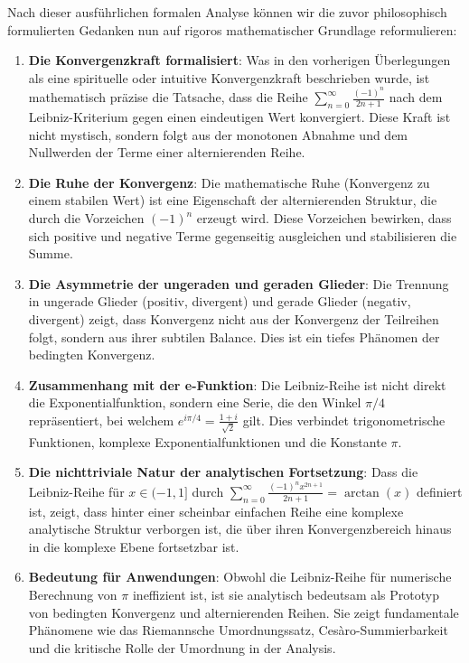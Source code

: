 \documentclass[a4paper, 12pt, twoside, openright]{report}
\theoremstyle{definition}
\theoremstyle{definition}
\begin{document}
Nach dieser ausführlichen formalen Analyse können wir die zuvor philosophisch formulierten Gedanken nun auf rigoros mathematischer Grundlage reformulieren:

\begin{enumerate}

\item \textbf{Die Konvergenzkraft formalisiert}: Was in den vorherigen Überlegungen als eine spirituelle oder intuitive Konvergenzkraft beschrieben wurde, ist mathematisch präzise die Tatsache, dass die Reihe $\sum_{n=0}^{\infty} \frac{(-1)^n}{2n+1}$ nach dem Leibniz-Kriterium gegen einen eindeutigen Wert konvergiert. Diese Kraft ist nicht mystisch, sondern folgt aus der monotonen Abnahme und dem Nullwerden der Terme einer alternierenden Reihe.

\item \textbf{Die Ruhe der Konvergenz}: Die mathematische Ruhe (Konvergenz zu einem stabilen Wert) ist eine Eigenschaft der alternierenden Struktur, die durch die Vorzeichen $(-1)^n$ erzeugt wird. Diese Vorzeichen bewirken, dass sich positive und negative Terme gegenseitig ausgleichen und stabilisieren die Summe.

\item \textbf{Die Asymmetrie der ungeraden und geraden Glieder}: Die Trennung in ungerade Glieder (positiv, divergent) und gerade Glieder (negativ, divergent) zeigt, dass Konvergenz nicht aus der Konvergenz der Teilreihen folgt, sondern aus ihrer subtilen Balance. Dies ist ein tiefes Phänomen der bedingten Konvergenz.

\item \textbf{Zusammenhang mit der e-Funktion}: Die Leibniz-Reihe ist nicht direkt die Exponentialfunktion, sondern eine Serie, die den Winkel $\pi/4$ repräsentiert, bei welchem $e^{i\pi/4} = \frac{1+i}{\sqrt{2}}$ gilt. Dies verbindet trigonometrische Funktionen, komplexe Exponentialfunktionen und die Konstante $\pi$.

\item \textbf{Die nichttriviale Natur der analytischen Fortsetzung}: Dass die Leibniz-Reihe für $x \in (-1, 1]$ durch $\sum_{n=0}^{\infty} \frac{(-1)^n x^{2n+1}}{2n+1} = \arctan(x)$ definiert ist, zeigt, dass hinter einer scheinbar einfachen Reihe eine komplexe analytische Struktur verborgen ist, die über ihren Konvergenzbereich hinaus in die komplexe Ebene fortsetzbar ist.

\item \textbf{Bedeutung für Anwendungen}: Obwohl die Leibniz-Reihe für numerische Berechnung von $\pi$ ineffizient ist, ist sie analytisch bedeutsam als Prototyp von bedingten Konvergenz und alternierenden Reihen. Sie zeigt fundamentale Phänomene wie das Riemannsche Umordnungssatz, Cesàro-Summierbarkeit und die kritische Rolle der Umordnung in der Analysis.

\end{enumerate}
\end{document}
